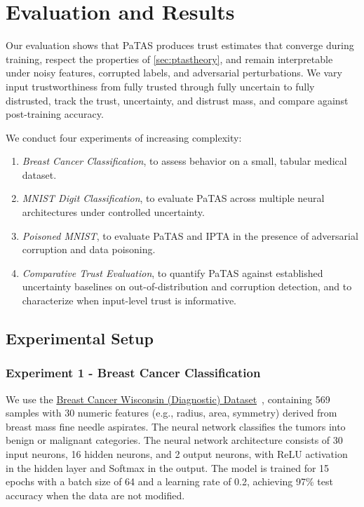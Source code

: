 \vspace{-0.5em}
\section{Evaluation and Results}\label{sec:evaluation}

Our evaluation shows that PaTAS produces trust estimates that converge during training, respect the properties of \cref{sec:ptastheory}, and remain interpretable under noisy features, corrupted labels, and adversarial perturbations. We vary input trustworthiness from fully trusted through fully uncertain to fully distrusted, track the trust, uncertainty, and distrust mass, and compare against post-training accuracy.

We conduct four experiments of increasing complexity:
\begin{enumerate}
  \item \emph{Breast Cancer Classification}, to assess behavior on a small, tabular medical dataset.
  \item \emph{MNIST Digit Classification}, to evaluate PaTAS across multiple neural architectures under controlled uncertainty.
  \item \emph{Poisoned MNIST}, to evaluate PaTAS and IPTA in the presence of adversarial corruption and data poisoning.
  \item \emph{Comparative Trust Evaluation}, to quantify PaTAS against established uncertainty baselines on out-of-distribution and corruption detection, and to characterize when input-level trust is informative.
\end{enumerate}

\vspace{-0.5em}
\subsection{Experimental Setup }
\subsubsection{Experiment 1 - Breast Cancer Classification}\label{exp:1}
We use the \href{https://archive.ics.uci.edu/dataset/17/breast+cancer+wisconsin+diagnostic}{Breast Cancer Wisconsin (Diagnostic) Dataset}~\cite{breastcancer-wisconsin}, containing 569 samples with 30 numeric features (e.g., radius, area, symmetry) derived from breast mass fine needle aspirates. The neural network classifies the tumors into benign or malignant categories.
The neural network architecture consists of 30 input neurons, 16 hidden neurons, and 2 output neurons, with ReLU activation in the hidden layer and Softmax in the output. The model is trained for 15 epochs with a batch size of 64 and a learning rate of 0.2, achieving 97\% test accuracy when the data are not modified.

